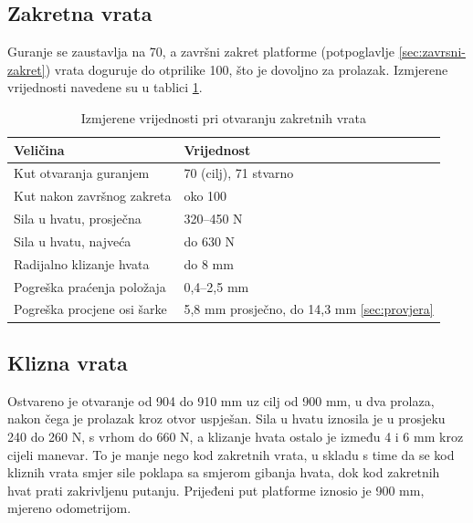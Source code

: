 \subsection{Zakretna vrata}

Guranje se zaustavlja na 70\textdegree{}, a završni zakret platforme
(potpoglavlje \ref{sec:zavrsni-zakret}) vrata doguruje do otprilike 100\textdegree{}, što je
dovoljno za prolazak. Izmjerene vrijednosti navedene su u tablici \ref{tab:rezultati-zakretna}.

\begin{table}[H]
      \centering
      \caption{Izmjerene vrijednosti pri otvaranju zakretnih vrata}
      \label{tab:rezultati-zakretna}
      \begin{tabular}{@{}ll@{}}
            \toprule
            Veličina                    & Vrijednost                                          \\
            \midrule
            Kut otvaranja guranjem      & 70\textdegree{} (cilj), 71\textdegree{}     stvarno \\
            Kut nakon završnog zakreta  & oko 100\textdegree{}                                \\
            Sila u hvatu, prosječna     & 320--450 N                                          \\
            Sila u hvatu, najveća       & do 630 N                                            \\
            Radijalno klizanje hvata    & do 8 mm                                             \\
            Pogreška praćenja položaja  & 0,4--2,5 mm                                         \\
            Pogreška procjene osi šarke & 5,8 mm prosječno, do 14,3 mm \ref{sec:provjera}     \\
            \bottomrule
      \end{tabular}
\end{table}

\subsection{Klizna vrata}

Ostvareno je otvaranje od 904 do 910 mm uz cilj od 900 mm, u dva prolaza, nakon čega je prolazak
kroz otvor uspješan. Sila u hvatu iznosila je u prosjeku 240 do 260 N, s vrhom do 660 N, a
klizanje hvata ostalo je između 4 i 6 mm kroz cijeli manevar. To je manje nego kod zakretnih
vrata, u skladu s time da se kod kliznih vrata smjer sile poklapa sa smjerom gibanja hvata, dok
kod zakretnih hvat prati zakrivljenu putanju. Prijeđeni put platforme iznosio je 900 mm, mjereno
odometrijom.


